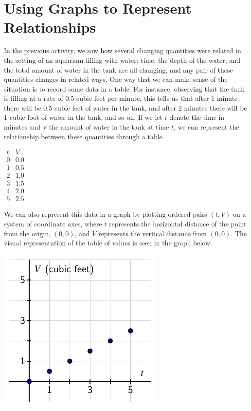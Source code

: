 \documentclass{ximera}
\begin{document}
\section{Using Graphs to Represent Relationships}
In the previous activity, we saw how several changing quantities were related in the setting of an aquarium filling with water: time, the depth of the water, and the total amount of water in the tank are all changing, and any pair of these quantities changes in related ways.  One way that we can make sense of the situation is to record some data in a table.  For instance, observing that the tank is filling at a rate of \(0.5\) cubic feet per minute, this tells us that after \(1\) minute there will be \(0.5\) cubic feet of water in the tank, and after \(2\) minutes there will be \(1\) cubic foot of water in the tank, and so on.  If we let \(t\) denote the time in minutes and \(V\) the amount of water in the tank at time \(t\), we can represent the relationship between these quantities through a table.%

\begin{center}
\(
\begin{array}{cc}
t&V\\
\hline
0&0.0\\
1&0.5\\
2&1.0\\
3&1.5\\
4&2.0\\
5&2.5
\end{array}
\)
\end{center}



We can also represent this data in a graph by plotting ordered pairs \((t,V)\) on a system of coordinate axes, where \(t\) represents the horizontal distance of the point from the origin, \((0,0)\), and \(V\) represents the vertical distance from \((0,0)\).  The visual representation of the table of values is seen in the graph below.%

\begin{image}
\includegraphics{tandem-aquarium-V-t}
\end{image}
\end{document}
